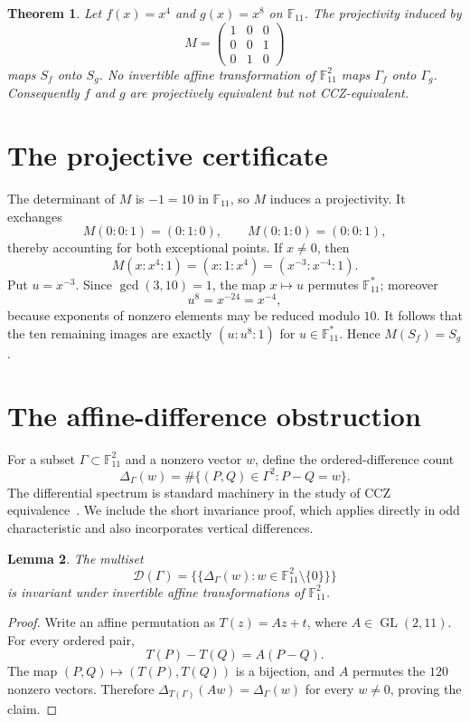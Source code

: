 \documentclass[11pt]{article}
\newtheorem{theorem}{Theorem}
\newtheorem{lemma}[theorem]{Lemma}
\newcommand{\F}{\mathbb F}
\newcommand{\GL}{\operatorname{GL}}
\begin{document}
\begin{theorem}\label{thm:main}
Let $f(x)=x^4$ and $g(x)=x^8$ on $\F_{11}$.  The projectivity induced by
\[
 M=\begin{pmatrix}
       1&0&0\\
       0&0&1\\
       0&1&0
    \end{pmatrix}
\]
maps $S_f$ onto $S_g$.  No invertible affine transformation of
$\F_{11}^2$ maps $\Gamma_f$ onto $\Gamma_g$.  Consequently $f$ and $g$
are projectively equivalent but not CCZ-equivalent.
\end{theorem}

\section{The projective certificate}

The determinant of $M$ is $-1=10$ in $\F_{11}$, so $M$ induces a
projectivity.  It exchanges
\[
 M(0:0:1)=(0:1:0),\qquad M(0:1:0)=(0:0:1),
\]
thereby accounting for both exceptional points.  If $x\ne0$, then
\[
 M(x:x^4:1)=(x:1:x^4)=(x^{-3}:x^{-4}:1).
\]
Put $u=x^{-3}$.  Since $\gcd(3,10)=1$, the map $x\mapsto u$ permutes
$\F_{11}^{*}$; moreover
\[
 u^8=x^{-24}=x^{-4},
\]
because exponents of nonzero elements may be reduced modulo $10$.
It follows that the ten remaining images are exactly
$(u:u^8:1)$ for $u\in\F_{11}^{*}$.  Hence $M(S_f)=S_g$.

\section{The affine-difference obstruction}

For a subset $\Gamma\subset\F_{11}^2$ and a nonzero vector $w$, define
the ordered-difference count
\[
 \Delta_\Gamma(w)
   =\#\{(P,Q)\in\Gamma^2:P-Q=w\}.
\]
The differential spectrum is standard machinery in the study of CCZ
equivalence~\cite{Kaleyski2021}.  We include the short invariance proof,
which applies directly in odd characteristic and also incorporates vertical
differences.

\begin{lemma}\label{lem:invariant}
The multiset
\[
 \mathcal D(\Gamma)=
 \bigl\{\!\bigl\{\Delta_\Gamma(w):
       w\in\F_{11}^2\setminus\{0\}\bigr\}\!\bigr\}
\]
is invariant under invertible affine transformations of $\F_{11}^2$.
\end{lemma}

\begin{proof}
Write an affine permutation as $T(z)=Az+t$, where
$A\in\GL(2,11)$.  For every ordered pair,
\[
 T(P)-T(Q)=A(P-Q).
\]
The map $(P,Q)\mapsto(T(P),T(Q))$ is a bijection, and $A$ permutes the
$120$ nonzero vectors.  Therefore
$\Delta_{T(\Gamma)}(Aw)=\Delta_\Gamma(w)$ for every $w\ne0$, proving the
claim.
\end{proof}
\end{document}
